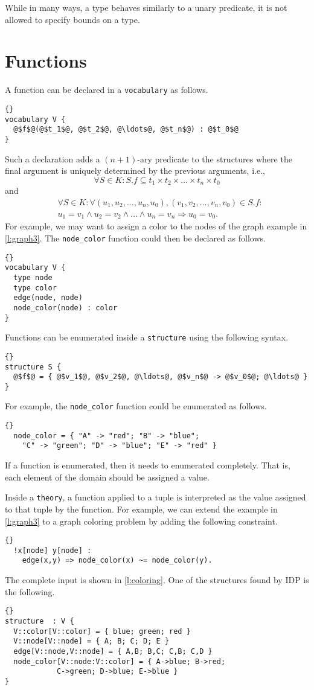 \documentclass{article}
\newcommand{\idp}{{\sc IDP}\xspace}
\begin{document}
While in many ways, a type behaves similarly to a unary predicate,
it is not allowed to specify bounds on a type.

\section{Functions}

A function can be declared in a \texttt{vocabulary} as follows.
\begin{lstlisting}[escapechar=@]{}
vocabulary V {
  @$f$@(@$t_1$@, @$t_2$@, @\ldots@, @$t_n$@) : @$t_0$@
}
\end{lstlisting}
Such a declaration adds a $(n+1)$-ary predicate to the structures
where the final argument is uniquely determined by the previous arguments,
i.e.,
$$
\forall S \in K : S.f \subseteq
	t_1 \times t_2 \times \ldots \times t_n \times t_0
$$
and
$$
\begin{aligned}
& \forall S \in K :
	\forall (u_1, u_2, \ldots, u_n, u_0),
	(v_1, v_2, \ldots, v_n, v_0) \in S.f: \\
&	u_1 = v_1 \wedge u_2 = v_2 \wedge \ldots \wedge u_n = v_n
	\Rightarrow u_0 = v_0
.
\end{aligned}
$$
For example, we may want to assign a color to the nodes
of the graph example in \autoref{l:graph3}.  The \texttt{node\_color}
function could then be declared as follows.
\begin{lstlisting}{}
vocabulary V {
  type node
  type color
  edge(node, node)
  node_color(node) : color
}
\end{lstlisting}

Functions can be enumerated inside a \texttt{structure} using the following
syntax.
\begin{lstlisting}[escapechar=@]{}
structure S {
  @$f$@ = { @$v_1$@, @$v_2$@, @\ldots@, @$v_n$@ -> @$v_0$@; @\ldots@ }
}
\end{lstlisting}
For example, the \texttt{node\_color} function could be enumerated as follows.
\begin{lstlisting}{}
  node_color = { "A" -> "red"; "B" -> "blue";
	"C" -> "green"; "D" -> "blue"; "E" -> "red" }
\end{lstlisting}
If a function is enumerated, then it needs to enumerated completely.
That is, each element of the domain should be assigned a value.

Inside a \texttt{theory}, a function applied to a tuple is interpreted
as the value assigned to that tuple by the function.
For example, we can extend the example in \autoref{l:graph3} to
a graph coloring problem by adding the following constraint.
\begin{lstlisting}{}
  !x[node] y[node] :
    edge(x,y) => node_color(x) ~= node_color(y).
\end{lstlisting}
The complete input is shown in \autoref{l:coloring}.
One of the structures found by \idp is the following.
\begin{lstlisting}{}
structure  : V {
  V::color[V::color] = { blue; green; red }
  V::node[V::node] = { A; B; C; D; E }
  edge[V::node,V::node] = { A,B; B,C; C,B; C,D }
  node_color[V::node:V::color] = { A->blue; B->red;
			C->green; D->blue; E->blue }
}
\end{lstlisting}
\end{document}
